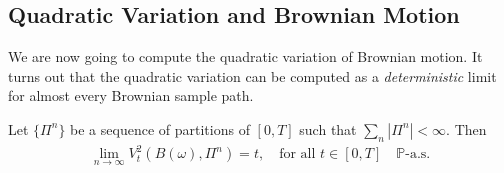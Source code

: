 \subsection{Quadratic Variation and Brownian Motion}
We are now going to compute the quadratic variation of Brownian motion. It turns out that the quadratic variation can be computed as a \textit{deterministic} limit for almost every Brownian sample path.

\begin{theorem}
	Let $\{\Pi^n\}$ be a sequence of partitions of $[0, T]$ such that $\sum_n |\Pi^n| < \infty$. Then
	\begin{align*}
		\lim_{n \rightarrow \infty} V_t^2(B(\omega), \Pi^n) = t, \quad \text{for all } t \in [0, T] \quad \mathbb{P}\text{-a.s.}
	\end{align*}
\end{theorem}
